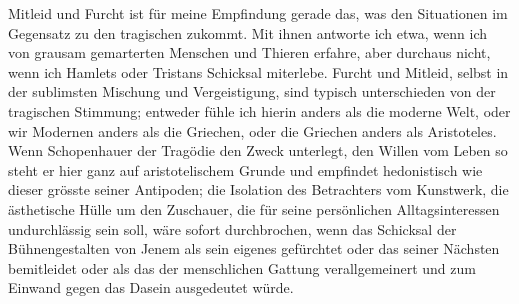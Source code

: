 Mitleid und Furcht ist für meine Empfindung gerade das, was den  Situationen im Gegensatz zu den tragischen zukommt. Mit ihnen antworte ich etwa, wenn ich von grausam gemarterten Menschen und Thieren erfahre, aber durchaus nicht, wenn ich Hamlets oder Tristans Schicksal miterlebe. Furcht und Mitleid, selbst in der sublimsten Mischung und Vergeistigung, sind typisch unterschieden von der tragischen Stimmung; entweder fühle ich hierin anders als die moderne Welt, oder wir Modernen anders als die Griechen, oder die Griechen anders als Aristoteles. Wenn Schopenhauer der Tragödie den Zweck unterlegt, den Willen vom Leben so steht er hier ganz auf aristotelischem Grunde und empfindet hedonistisch wie dieser grösste seiner Antipoden; die Isolation des Betrachters vom Kunstwerk, die ästhetische Hülle um den Zuschauer, die für seine persönlichen Alltagsinteressen undurchlässig sein soll, wäre sofort durchbrochen, wenn das Schicksal der Bühnengestalten von Jenem als sein eigenes gefürchtet oder das seiner Nächsten bemitleidet oder als das der menschlichen Gattung verallgemeinert und zum Einwand gegen das Dasein ausgedeutet würde.
\par

